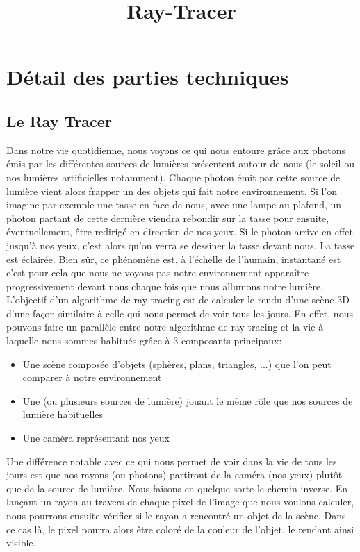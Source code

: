 \documentclass[11pt]{article}
\author{}
\title{Ray-Tracer}
\date{}
\begin{document}
\maketitle

\section{Détail des parties techniques}
\subsection{Le Ray Tracer}
Dans notre vie quotidienne, nous voyons ce qui nous entoure grâce aux photons émis par les différentes sources de lumières présentent autour de nous (le soleil ou nos lumières artificielles notamment). Chaque photon émit par cette source de lumière vient alors frapper un des objets qui fait notre environnement. Si l'on imagine par exemple une tasse en face de nous, avec une lampe au plafond, un photon partant de cette dernière viendra rebondir sur la tasse pour ensuite, éventuellement, être redirigé en direction de nos yeux. Si le photon arrive en effet jusqu'à nos yeux, c'est alors qu'on verra se dessiner la tasse devant nous. La tasse est éclairée. Bien sûr, ce phénomène est, à l'échelle de l'humain, instantané est c'est pour cela que nous ne voyons pas notre environnement apparaître progressivement devant nous chaque fois que nous allumons notre lumière. \\
L'objectif d'un algorithme de ray-tracing est de calculer le rendu d'une scène 3D d'une façon similaire à celle qui nous permet de voir tous les jours. En effet, nous pouvons faire un parallèle entre notre algorithme de ray-tracing et la vie à laquelle nous sommes habitués grâce à 3 composants principaux:
\begin{itemize}
	\item{Une scène composée d'objets (sphères, plans, triangles, ...) que l'on peut comparer à notre environnement}
	\item{Une (ou plusieurs sources de lumière) jouant le même rôle que nos sources de lumière habituelles}
	\item{Une caméra représentant nos yeux}
\end{itemize}
Une différence notable avec ce qui nous permet de voir dans la vie de tous les jours est que nos rayons (ou photons) partiront de la caméra (nos yeux) plutôt que de la source de lumière. Nous faisons en quelque sorte le chemin inverse. En lançant un rayon au travers de chaque pixel de l'image que nous voulons calculer, nous pourrons ensuite vérifier si le rayon a rencontré un objet de la scène. Dans ce cas là, le pixel pourra alors être coloré de la couleur de l'objet, le rendant ainsi visible.
\end{document}
